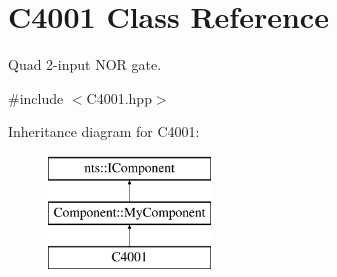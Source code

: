 \hypertarget{classC4001}{}\section{C4001 Class Reference}
\label{classC4001}


Quad 2-\/input N\+OR gate.  




{\ttfamily \#include $<$C4001.\+hpp$>$}

Inheritance diagram for C4001\+:\begin{figure}[H]
\begin{center}
\leavevmode
\includegraphics[height=3.000000cm]{classC4001}
\end{center}
\end{figure}
